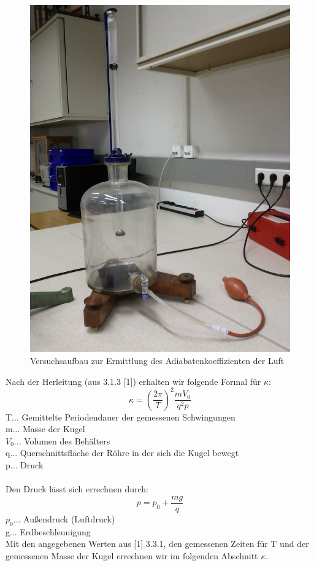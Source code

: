 \documentclass[12pt,a4paper]{article}
\begin{document}
\begin{multicols}{2}
\begin{figure}[H]
	\includegraphics[scale=0.25]{./figure/koeffizient.png}
	\caption{Versuchsaufbau zur Ermittlung des Adiabatenkoeffizienten der Luft}
	\label{fig:adiabatenkoeffizienten_aufbau}
\end{figure}
\noindent
Nach der Herleitung (aus 3.1.3 [1]) erhalten wir folgende Formal für $\kappa$:
$$\kappa = \left(\frac{2\pi}{T}\right)^2  \frac{m V_0}{q^2  p}$$
T... Gemittelte Periodendauer der gemessenen Schwingungen\\
m... Masse der Kugel\\
$V_0$... Volumen des Behälters\\
q... Querschnittsfläche der Röhre in der sich die Kugel bewegt\\
p... Druck\\
\\
Den Druck lässt sich errechnen durch:
$$p = p_0 + \frac{m g}{q}$$
$p_0$... Außendruck (Luftdruck)\\
g... Erdbeschleunigung\\
Mit den angegebenen Werten aus [1] 3.3.1, den gemessenen Zeiten für T und der gemessenen Masse der Kugel errechnen wir im folgenden Abschnitt $\kappa$.
%

\end{multicols}
\end{document}
